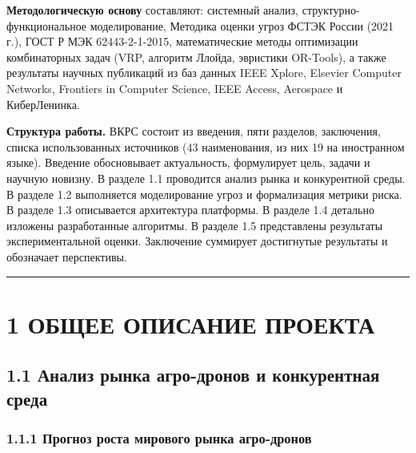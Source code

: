 \textbf{Методологическую основу} составляют: системный анализ, структурно-функциональное моделирование, Методика оценки угроз ФСТЭК России (2021 г.), ГОСТ Р МЭК 62443-2-1-2015, математические методы оптимизации комбинаторных задач (VRP, алгоритм Ллойда, эвристики OR-Tools), а также результаты научных публикаций из баз данных IEEE Xplore, Elsevier Computer Networks, Frontiers in Computer Science, IEEE Access, Aerospace и КиберЛенинка.

\textbf{Структура работы.} ВКРС состоит из введения, пяти разделов, заключения, списка использованных источников (43 наименования, из них 19 на иностранном языке). Введение обосновывает актуальность, формулирует цель, задачи и научную новизну. В разделе 1.1 проводится анализ рынка и конкурентной среды. В разделе 1.2 выполняется моделирование угроз и формализация метрики риска. В разделе 1.3 описывается архитектура платформы. В разделе 1.4 детально изложены разработанные алгоритмы. В разделе 1.5 представлены результаты экспериментальной оценки. Заключение суммирует достигнутые результаты и обозначает перспективы.

\begin{center}\rule{0.5\linewidth}{0.5pt}\end{center}

\hypertarget{ux43eux431ux449ux435ux435-ux43eux43fux438ux441ux430ux43dux438ux435-ux43fux440ux43eux435ux43aux442ux430}{%
\section{1 ОБЩЕЕ ОПИСАНИЕ ПРОЕКТА}\label{ux43eux431ux449ux435ux435-ux43eux43fux438ux441ux430ux43dux438ux435-ux43fux440ux43eux435ux43aux442ux430}}

\hypertarget{ux430ux43dux430ux43bux438ux437-ux440ux44bux43dux43aux430-ux430ux433ux440ux43e-ux434ux440ux43eux43dux43eux432-ux438-ux43aux43eux43dux43aux443ux440ux435ux43dux442ux43dux430ux44f-ux441ux440ux435ux434ux430}{%
\subsection{1.1 Анализ рынка агро-дронов и конкурентная среда}\label{ux430ux43dux430ux43bux438ux437-ux440ux44bux43dux43aux430-ux430ux433ux440ux43e-ux434ux440ux43eux43dux43eux432-ux438-ux43aux43eux43dux43aux443ux440ux435ux43dux442ux43dux430ux44f-ux441ux440ux435ux434ux430}}

\hypertarget{ux43fux440ux43eux433ux43dux43eux437-ux440ux43eux441ux442ux430-ux43cux438ux440ux43eux432ux43eux433ux43e-ux440ux44bux43dux43aux430-ux430ux433ux440ux43e-ux434ux440ux43eux43dux43eux432}{%
\subsubsection{1.1.1 Прогноз роста мирового рынка агро-дронов}\label{ux43fux440ux43eux433ux43dux43eux437-ux440ux43eux441ux442ux430-ux43cux438ux440ux43eux432ux43eux433ux43e-ux440ux44bux43dux43aux430-ux430ux433ux440ux43e-ux434ux440ux43eux43dux43eux432}}

